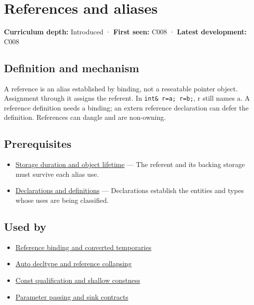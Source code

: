 \hypertarget{appendix-d6d562ca9fbb}{}\label{referencestart:appendix-d6d562ca9fbb}
\section{References and aliases}\label{appendix-d6d562ca9fbb-references-and-aliases}

\textbf{Curriculum depth:} Introduced · \textbf{First seen:} C008 · \textbf{Latest development:} C008

\subsection{Definition and mechanism}\label{appendix-d6d562ca9fbb-definition-and-mechanism}

A reference is an alias established by binding, not a reseatable pointer object. Assignment through it assigns the referent. In \texttt{int\&\ r=a;\ r=b;}, r still names a. A reference definition needs a binding; an extern reference declaration can defer the definition. References can dangle and are non-owning.

\subsection{Prerequisites}\label{appendix-d6d562ca9fbb-prerequisites}

\begin{itemize}
\tightlist
\item
  \hyperref[appendix-0b104bcba06b]{Storage duration and object lifetime} --- The referent and its backing storage must survive each alias use.
\item
  \hyperref[appendix-2e4d494c2d94]{Declarations and definitions} --- Declarations establish the entities and types whose uses are being classified.
\end{itemize}

\subsection{Used by}\label{appendix-d6d562ca9fbb-used-by}

\begin{itemize}
\tightlist
\item
  \hyperref[appendix-37856d997bb0]{Reference binding and converted temporaries}
\item
  \hyperref[appendix-5d4252a42886]{Auto decltype and reference collapsing}
\item
  \hyperref[appendix-c25d60fed375]{Const qualification and shallow constness}
\item
  \hyperref[appendix-d5908f75721f]{Parameter passing and sink contracts}
\end{itemize}

